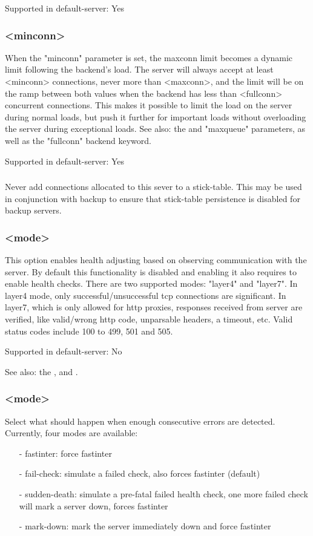   Supported in default-server: Yes

\subsubsection[minconn]{ <minconn>}
  When the "minconn" parameter is set, the maxconn limit becomes a dynamic
  limit following the backend's load. The server will always accept at least
  <minconn> connections, never more than <maxconn>, and the limit will be on
  the ramp between both values when the backend has less than <fullconn>
  concurrent connections. This makes it possible to limit the load on the
  server during normal loads, but push it further for important loads without
  overloading the server during exceptional loads.
See also: the 
  and "maxqueue" parameters, as well as the "fullconn" backend keyword.

  Supported in default-server: Yes

\subsubsection[non-stick]{}
  Never add connections allocated to this sever to a stick-table.
  This may be used in conjunction with backup to ensure that
  stick-table persistence is disabled for backup servers.

\subsubsection[observe]{ <mode>}
  This option enables health adjusting based on observing communication with
  the server. By default this functionality is disabled and enabling it also
  requires to enable health checks. There are two supported modes: "layer4" and
  "layer7". In layer4 mode, only successful/unsuccessful tcp connections are
  significant. In layer7, which is only allowed for http proxies, responses
  received from server are verified, like valid/wrong http code, unparsable
  headers, a timeout, etc. Valid status codes include 100 to 499, 501 and 505.

  Supported in default-server: No


See also: the ,  and .

\subsubsection[on-error]{ <mode>}
  Select what should happen when enough consecutive errors are detected.
  Currently, four modes are available:
  \begin{itemize}
  \item[-] fastinter: force fastinter
  \item[-] fail-check: simulate a failed check, also forces fastinter (default)
  \item[-] sudden-death: simulate a pre-fatal failed health check, one more failed
    check will mark a server down, forces fastinter
  \item[-] mark-down: mark the server immediately down and force fastinter
  \end{itemize}

